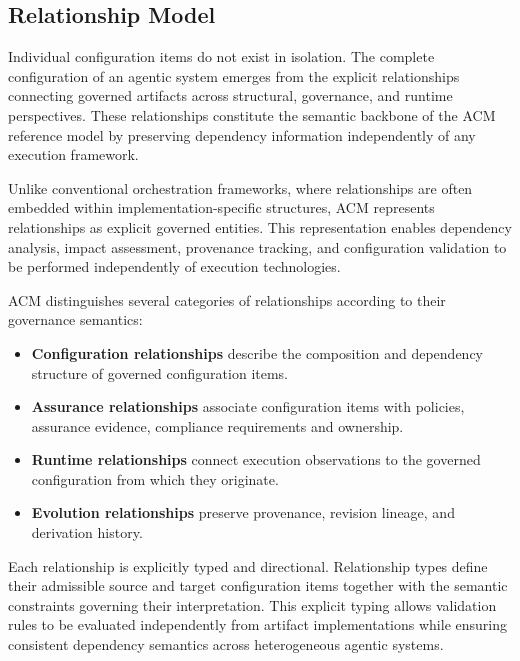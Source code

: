 \documentclass[10pt]{article}
\begin{document}
\subsection{Relationship Model}
\label{sec:configuration_relationships}

Individual configuration items do not exist in isolation. The complete configuration of an agentic system emerges from the explicit relationships connecting governed artifacts across structural, governance, and runtime perspectives. These relationships constitute the semantic backbone of the ACM reference model by preserving dependency information independently of any execution framework.

Unlike conventional orchestration frameworks, where relationships are often embedded within implementation-specific structures, ACM represents relationships as explicit governed entities. This representation enables dependency analysis, impact assessment, provenance tracking, and configuration validation to be performed independently of execution technologies.

ACM distinguishes several categories of relationships according to their governance semantics:

\begin{itemize}

\item \textbf{Configuration relationships} describe the composition and dependency structure of governed configuration items.

\item \textbf{Assurance relationships} associate configuration items with policies, assurance evidence, compliance requirements and ownership.

\item \textbf{Runtime relationships} connect execution observations to the governed configuration from which they originate.

\item \textbf{Evolution relationships} preserve provenance, revision lineage, and derivation history.

\end{itemize}

Each relationship is explicitly typed and directional. Relationship types define their admissible source and target configuration items together with the semantic constraints governing their interpretation. This explicit typing allows validation rules to be evaluated independently from artifact implementations while ensuring consistent dependency semantics across heterogeneous agentic systems.
\end{document}

